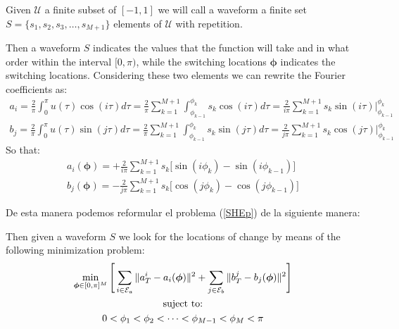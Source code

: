 \begin{definition}[Waveform]
    Given $ \mathcal {U} $ a finite subset of $ [- 1,1] $ we will call a waveform a finite set $ S = \{s_1, s_2, s_3, \dots, s_ {M + 1} \} $ elements of  $ \mathcal {U} $ with repetition.
\end{definition}

Then a waveform $ S $ indicates the values that the function will take and in what order within the interval $ [0, \pi) $, while the switching locations $ \bm {\phi} $ indicates the switching locations. Considering these two elements we can rewrite the Fourier coefficients as:
\begin{gather}
    a_i = \frac{2}{\pi} \int_0^\pi u(\tau ) \cos(i \tau)d\tau  = \frac{2}{\pi} \sum_{k =  1}^{M+1} 
    \int_{\phi_{k-1}}^{\phi_{k}} s_k  \cos(i\tau)d\tau = \frac{2}{i\pi} \sum_{k=1}^{M+1} s_k \sin(i\tau) \Big|_{\phi_{k-1}}^{\phi_k} 
\end{gather}
\begin{gather}
    b_j = \frac{2}{\pi} \int_0^\pi u(\tau ) \sin(j \tau)d\tau =
    \frac{2}{\pi} \sum_{k =1}^{M+1} 
    \int_{\phi_{k-1}}^{\phi_{k}} s_k \sin(j\tau)d\tau = 
    \frac{2}{j\pi} \sum_{k=1}^{M+1} 
    s_k \cos(j\tau) \Big|_{\phi_{k-1}}^{\phi_k} 
\end{gather}
So that:
\begin{gather}
    a_i(\bm{\phi}) = +\frac{2}{i\pi}  \sum_{k=1}^{M+1} s_k \Big[ \sin(i\phi_k) -\sin(i\phi_{k-1})\Big] \\
    b_j(\bm{\phi}) = -\frac{2}{j\pi}  \sum_{k=1}^{M+1} s_k \Big[ \cos(j\phi_k) -\cos(j\phi_{k-1})\Big]
\end{gather}

De esta manera podemos reformular el problema (\ref{SHEp}) de la siguiente manera:
\begin{problem}
    Then given a waveform $ S $ we look for the locations of change by means of the following minimization problem:
        \begin{gather} 
        \min_{\bm{\phi} \in [0,\pi]^{M} }  \Bigg[
        \sum_{i \in \mathcal{E}_a} \| a_T^i - a_i(\bm{\phi}) \|^2 +
        \sum_{j \in \mathcal{E}_b} \| b_T^j - b_j(\bm{\phi}) \|^2 \Bigg]
        \\
        \notag \text{suject to:}
        \\
        0 <\phi_1 < \phi_2 < \dots < \phi_{M-1} < \phi_{M} < \pi  
    \end{gather}
\end{problem}

